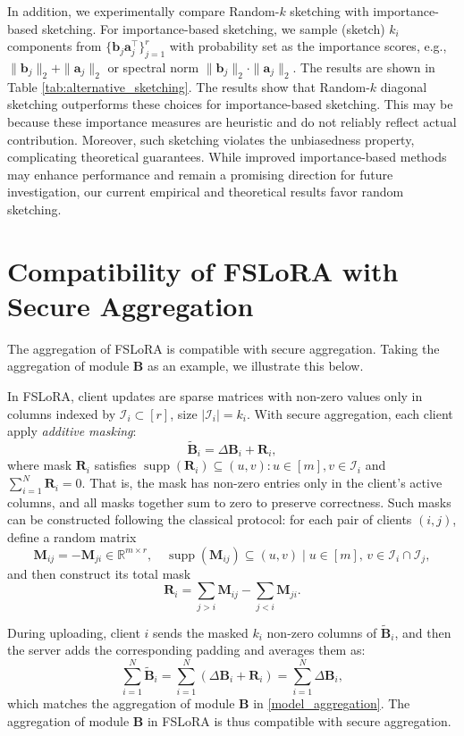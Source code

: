 \documentclass{article} %
\theoremstyle{plain}
\theoremstyle{definition}
\begin{document}
In addition, we experimentally compare Random-$k$ sketching with importance-based sketching. For importance-based sketching, we sample (sketch) $k_i$ components from $\{ \mathbf{b}_j \mathbf{a}_j^\top \}_{j=1}^r$ with probability set as the importance scores, e.g., $\|\mathbf{b}_j\|_2 + \|\mathbf{a}_j\|_2$ or spectral norm $\|\mathbf{b}_j\|_2 \cdot \|\mathbf{a}_j\|_2$. The results are shown in Table \ref{tab:alternative_sketching}. The results show that Random-$k$ diagonal sketching outperforms these choices for importance-based sketching. This may be because these importance measures are heuristic and do not reliably reflect actual contribution. Moreover, such sketching violates the unbiasedness property, complicating theoretical guarantees. While improved importance-based methods may enhance performance and remain a promising direction for future investigation, our current empirical and theoretical results favor random sketching.


\section{Compatibility of FSLoRA with Secure Aggregation}\label{appen:secure_aggregation}
The aggregation of FSLoRA is compatible with secure aggregation. Taking the aggregation of module $\mathbf{B}$ as an example, we illustrate this below. 

In FSLoRA, client updates are sparse matrices with non-zero values only in columns indexed by $\mathcal{I}_i \subset [r]$, size $|\mathcal{I}_i| = k_i$. With secure aggregation, each client apply \emph{additive masking}:
\[
\tilde{\mathbf{B}}_i = \Delta \mathbf{B}_i + \mathbf{R}_i,
\]
where mask $\mathbf{R}_i$ satisfies $\operatorname{supp}(\mathbf{R}_i) \subseteq (u,v): u \in [m], v \in \mathcal{I}_i$ and $\sum_{i=1}^N \mathbf{R}_i = 0$. That is, the mask has non-zero entries only in the client's active columns, and all masks together sum to zero to preserve correctness. Such masks can be constructed following the classical protocol: for each pair of clients $(i,j)$, define a random matrix
\[
\mathbf{M}_{ij} = - \mathbf{M}_{ji} \in \mathbb{R}^{m \times r}, 
\quad \operatorname{supp}(\mathbf{M}_{ij}) \subseteq (u,v) \;|\; u \in [m], \, v \in \mathcal{I}_i \cap \mathcal{I}_j,
\]
and then construct its total mask
\[
\mathbf{R}_i = \sum_{j>i} \mathbf{M}_{ij} - \sum_{j<i} \mathbf{M}_{ji}.
\]

During uploading, client $i$ sends the masked $k_i$ non-zero columns of $\tilde{\mathbf{B}}_i$, and then the server adds the corresponding padding and averages them as:
\[
\sum_{i=1}^N \tilde{\mathbf{B}}_i 
= \sum_{i=1}^N \left( \Delta \mathbf{B}_i + \mathbf{R}_i \right) 
= \sum_{i=1}^N \Delta \mathbf{B}_i,
\]
which matches the aggregation of module $\mathbf{B}$ in \eqref{model_aggregation}. The aggregation of module $\mathbf{B}$ in FSLoRA is thus compatible with secure aggregation. 
\end{document}
